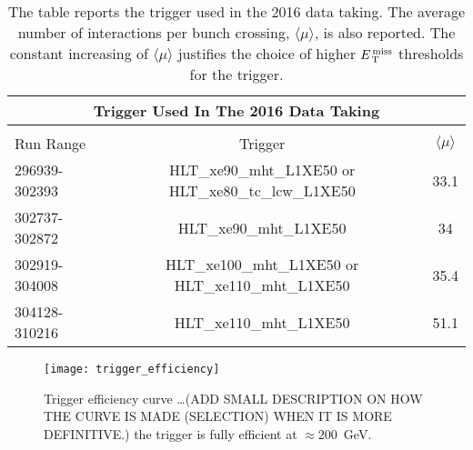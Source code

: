 \begin{table}[!hb]
  \centering
  \begin{tabular}{lcc}
    \toprule
    \multicolumn{3}{c}{Trigger Used In The 2016 Data Taking} \\
    \midrule \midrule \\
    Run Range & Trigger & $\langle \mu \rangle$ \\
    296939-302393 & HLT\_xe90\_mht\_L1XE50 or HLT\_xe80\_tc\_lcw\_L1XE50 & 33.1 \\
    302737-302872 & HLT\_xe90\_mht\_L1XE50 & 34 \\
    302919-304008 & HLT\_xe100\_mht\_L1XE50 or HLT\_xe110\_mht\_L1XE50 & 35.4 \\
    304128-310216 & HLT\_xe110\_mht\_L1XE50 & 51.1 \\
    \bottomrule
  \end{tabular}
  \caption{The table reports the trigger used in the 2016 data taking. The
    average number of interactions per bunch crossing, $\langle \mu \rangle$, is
  also reported. The constant increasing of $\langle \mu \rangle$ justifies the
  choice of higher $E_\mathrm{\, T}^\mathrm{\, miss}$ thresholds for the trigger.}
  \label{tab:trigger_periods}
\end{table}
\begin{figure}[!ht]
  \centering
    \texttt{[image: trigger\_efficiency]}
    \caption{Trigger efficiency curve \dots (ADD SMALL DESCRIPTION ON HOW THE
      CURVE IS MADE (SELECTION) WHEN IT IS MORE DEFINITIVE.) the trigger is
      fully efficient at $\approx 200$~GeV.}
    \label{fig:trigger_efficiency}
\end{figure}
